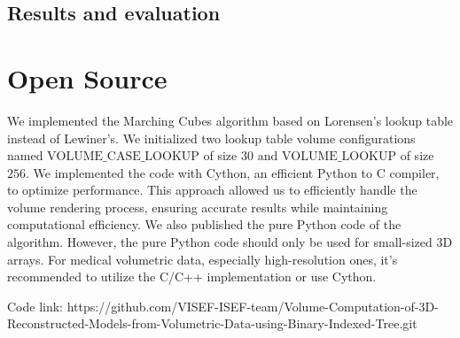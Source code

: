 \documentclass[11pt]{article}
\begin{document}
\begin{multicols}{2}
\subsection{Results and evaluation}

\section{Open Source}
We implemented the Marching Cubes algorithm based on Lorensen's lookup table instead of Lewiner's. We initialized two lookup table volume configurations named $\text{VOLUME\_CASE\_LOOKUP}$ of size $30$ and $\text{VOLUME\_LOOKUP}$ of size $256$. We implemented the code with Cython, an efficient Python to C compiler, to optimize performance. This approach allowed us to efficiently handle the volume rendering process, ensuring accurate results while maintaining computational efficiency. We also published the pure Python code of the algorithm. However, the pure Python code should only be used for small-sized 3D arrays. For medical volumetric data, especially high-resolution ones, it's recommended to utilize the C/C++ implementation or use Cython.

Code link: https://github.com/VISEF-ISEF-team/Volume-Computation-of-3D-Reconstructed-Models-from-Volumetric-Data-using-Binary-Indexed-Tree.git

\newpage


\end{multicols}
\end{document}
